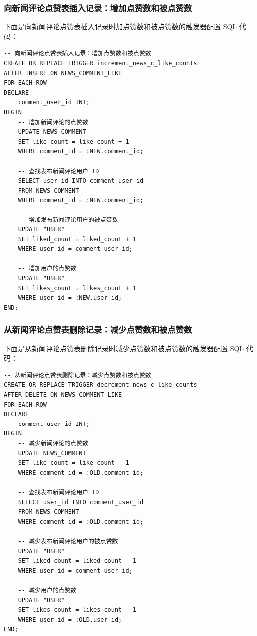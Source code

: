 \subsubsection{向新闻评论点赞表插入记录：增加点赞数和被点赞数}

下面是向新闻评论点赞表插入记录时加点赞数和被点赞数的触发器配置 SQL 代码：

\begin{verbatim}
-- 向新闻评论点赞表插入记录：增加点赞数和被点赞数
CREATE OR REPLACE TRIGGER increment_news_c_like_counts
AFTER INSERT ON NEWS_COMMENT_LIKE
FOR EACH ROW
DECLARE
    comment_user_id INT;
BEGIN
    -- 增加新闻评论的点赞数
    UPDATE NEWS_COMMENT
    SET like_count = like_count + 1
    WHERE comment_id = :NEW.comment_id;

    -- 查找发布新闻评论用户 ID
    SELECT user_id INTO comment_user_id
    FROM NEWS_COMMENT
    WHERE comment_id = :NEW.comment_id;

    -- 增加发布新闻评论用户的被点赞数
    UPDATE "USER"
    SET liked_count = liked_count + 1
    WHERE user_id = comment_user_id;

    -- 增加用户的点赞数
    UPDATE "USER"
    SET likes_count = likes_count + 1
    WHERE user_id = :NEW.user_id;
END;
\end{verbatim}

\subsubsection{从新闻评论点赞表删除记录：减少点赞数和被点赞数}

下面是从新闻评论点赞表删除记录时减少点赞数和被点赞数的触发器配置 SQL 代码：

\begin{verbatim}
-- 从新闻评论点赞表删除记录：减少点赞数和被点赞数
CREATE OR REPLACE TRIGGER decrement_news_c_like_counts
AFTER DELETE ON NEWS_COMMENT_LIKE
FOR EACH ROW
DECLARE
    comment_user_id INT;
BEGIN
    -- 减少新闻评论的点赞数
    UPDATE NEWS_COMMENT
    SET like_count = like_count - 1
    WHERE comment_id = :OLD.comment_id;

    -- 查找发布新闻评论用户 ID
    SELECT user_id INTO comment_user_id
    FROM NEWS_COMMENT
    WHERE comment_id = :OLD.comment_id;

    -- 减少发布新闻评论用户的被点赞数
    UPDATE "USER"
    SET liked_count = liked_count - 1
    WHERE user_id = comment_user_id;

    -- 减少用户的点赞数
    UPDATE "USER"
    SET likes_count = likes_count - 1
    WHERE user_id = :OLD.user_id;
END;
\end{verbatim}

